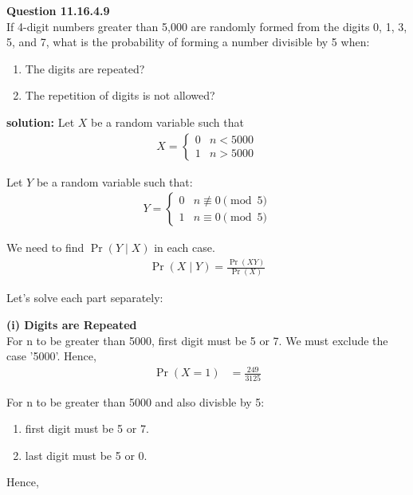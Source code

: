 \documentclass{article}
\begin{document}
\providecommand{\pr}[1]{\ensuremath{\Pr\left(#1\right)}}
\providecommand{\brak}[1]{\ensuremath{\left(#1\right)}}
\newcommand{\solution}{\noindent \textbf{solution: }}

\textbf{Question 11.16.4.9}\\
If 4-digit numbers greater than 5,000 are randomly formed from the digits 0, 1, 3, 5, and 7, what is the probability of forming a number divisible by 5 when:
\begin{enumerate}
    \item The digits are repeated?
    \item The repetition of digits is not allowed?
\end{enumerate}

\solution
Let $X$ be a random variable such that 
\begin{align}
	X = \begin{cases}
		0 &  n<5000\\
		1 &  n>5000\end{cases}
\end{align}

Let $Y$ be a random variable such that:
\begin{align}
	Y = \begin{cases}
		0 & n \not\equiv 0 \pmod{5}\\
		1 & n \equiv 0 \pmod{5}\end{cases}
\end{align}

We need to find \pr{Y \mid X} in each case. \\

\begin{align}
	\pr{X \mid Y}=\frac{\pr{XY} }{\pr{X}}
\end{align}

Let's solve each part separately:

\textbf{(i) Digits are Repeated}\\

For n to be greater than 5000, first digit must be 5 or 7. We must exclude the case '5000'. Hence,
\begin{align}
	\pr{X=1} &=\frac{249}{3125}
\end{align}

For n to be greater than 5000 and also divisble by 5:
\begin{enumerate}
\item first digit must be 5 or 7.
\item last digit must be 5 or 0.
\end{enumerate}
Hence,
\end{document}
